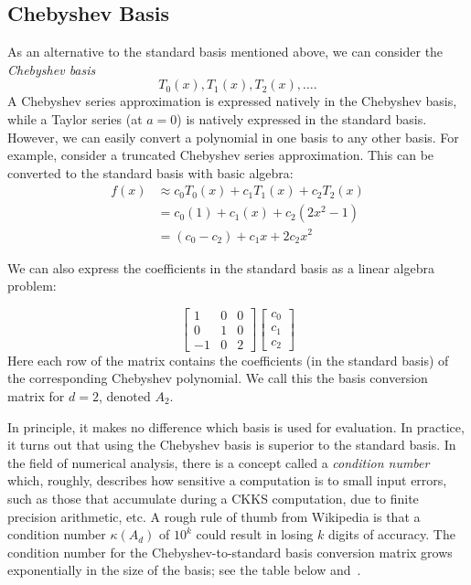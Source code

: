 \documentclass[../fheimpl.tex]{subfiles}
\begin{document}
	\subsection{Chebyshev Basis}
	As an alternative to the standard basis mentioned above, we can consider the \emph{Chebyshev basis} \[{T_0(x), T_1(x), T_2(x), \ldots}.\] A Chebyshev series approximation is expressed natively in the Chebyshev basis, while a Taylor series (at $a=0$) is natively expressed in the standard basis. However, we can easily convert a polynomial in one basis to any other basis. For example, consider a truncated Chebyshev series approximation. This can be converted to the standard basis with basic algebra:
	\begin{align*}
		f(x) & \approx c_0T_0(x) + c_1T_1(x) + c_2T_2(x) \\
		& = c_0(1) + c_1(x) + c_2(2x^2-1) \\
		& = (c_0-c_2) + c_1x + 2c_2x^2
	\end{align*}
	
	We can also express the coefficients in the standard basis as a linear algebra problem:
	
	\[
	\begin{bmatrix}
		1       & 0 & 0 \\
		0       & 1 & 0 \\
		-1      & 0 & 2
	\end{bmatrix}
	\begin{bmatrix}
		c_0 \\
		c_1 \\
		c_2
	\end{bmatrix}
	\]
	Here each row of the matrix contains the coefficients (in the standard basis) of the corresponding Chebyshev polynomial. We call this the basis conversion matrix for $d=2$, denoted $A_2$.
	
	In principle, it makes no difference which basis is used for evaluation. In practice, it turns out that using the Chebyshev basis is superior to the standard basis. In the field of numerical analysis, there is a concept called a \emph{condition number} which, roughly, describes how sensitive a computation is to small input errors, such as those that accumulate during a CKKS computation, due to finite precision arithmetic, etc. A rough rule of thumb from Wikipedia is that a condition number $\kappa(A_d)$ of $10^k$ could result in losing $k$ digits of accuracy. The condition number for the Chebyshev-to-standard basis conversion matrix grows exponentially in the size of the basis; see the table below and~\cite{conditionnum}.
	
\end{document}

